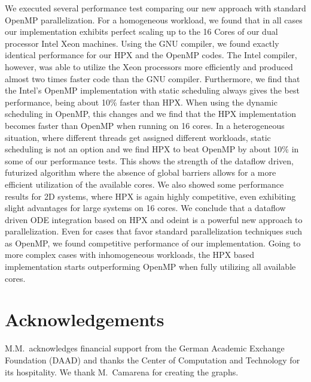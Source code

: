 \documentclass[10pt]{elsarticle}
\begin{document}
We executed several performance test comparing our new approach with standard OpenMP parallelization.
For a homogeneous workload, we found that in all cases our implementation exhibits perfect scaling up to the 16 Cores of our dual processor Intel Xeon machines.
Using the GNU compiler, we found exactly identical performance for our HPX and the OpenMP codes.
The Intel compiler, however, was able to utilize the Xeon processors more efficiently and produced almost two times faster code than the GNU compiler.
Furthermore, we find that the Intel's OpenMP implementation with static scheduling always gives the best performance, being about 10\% faster than HPX.
When using the dynamic scheduling in OpenMP, this changes and we find that the HPX implementation becomes faster than OpenMP when running on 16 cores.
In a heterogeneous situation, where different threads get assigned different workloads, static scheduling is not an option and we find HPX to beat OpenMP by about 10\% in some of our performance tests.
This shows the strength of the dataflow driven, futurized algorithm where the absence of global barriers allows for a more efficient utilization of the available cores.
We also showed some performance results for 2D systems, where HPX is again highly competitive, even exhibiting slight advantages for large systems on 16 cores.
We conclude that a dataflow driven ODE integration based on HPX and odeint is a powerful new approach to parallelization.
Even for cases that favor standard parallelization techniques such as OpenMP, we found competitive performance of our implementation.
Going to more complex cases with inhomogeneous workloads, the HPX based implementation starts outperforming OpenMP when fully utilizing all available cores.

\section*{Acknowledgements}

M.M.\ acknowledges financial support from the German Academic Exchange Foundation (DAAD) and thanks the Center of Computation and Technology for its hospitality.
We thank M.~Camarena for creating the graphs.



\end{document}

